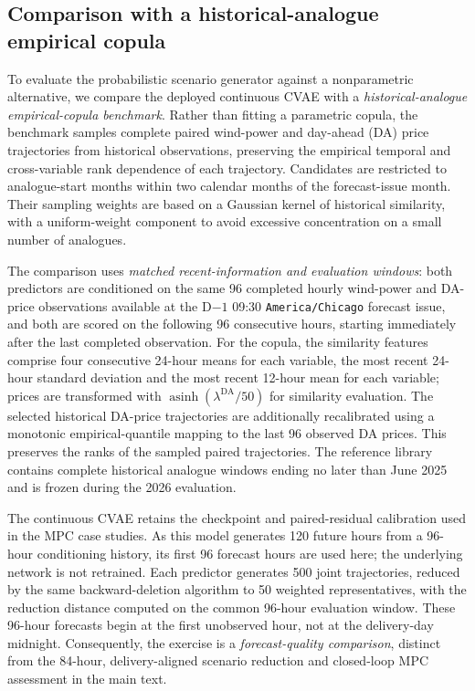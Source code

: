 \subsection{Comparison with a historical-analogue empirical copula}
\label{app:cvae_copula_96x96}

To evaluate the probabilistic scenario generator against a nonparametric
alternative, we compare the deployed continuous CVAE with a
\emph{historical-analogue empirical-copula benchmark}. Rather than fitting a
parametric copula, the benchmark samples complete paired wind-power and
day-ahead (DA) price trajectories from historical observations, preserving
the empirical temporal and cross-variable rank dependence of each trajectory.
Candidates are restricted to analogue-start months within two calendar months of
the forecast-issue month. Their sampling weights are based on a Gaussian kernel of
historical similarity, with a uniform-weight component to avoid excessive
concentration on a small number of analogues.

The comparison uses \emph{matched recent-information and evaluation windows}:
both predictors are conditioned on the same 96 completed hourly wind-power
and DA-price observations available at the D$-1$ 09:30
\texttt{America/Chicago} forecast issue, and both are scored on the
following 96 consecutive hours, starting immediately after the last completed
observation. For the copula, the similarity features comprise four consecutive
24-hour means for each variable, the most recent 24-hour standard deviation
and the most recent 12-hour mean for each variable; prices are transformed
with $\operatorname{asinh}(\lambda^{\mathrm{DA}}/50)$ for similarity evaluation.
The selected historical DA-price trajectories are additionally recalibrated
using a monotonic empirical-quantile mapping to the last 96 observed DA
prices. This preserves the ranks of the sampled paired trajectories.
The reference library contains complete historical analogue windows ending
no later than June 2025 and is frozen during the 2026 evaluation.

The continuous CVAE retains the checkpoint and paired-residual calibration
used in the MPC case studies. As this model generates 120 future hours from a
96-hour conditioning history, its first 96 forecast hours are used here;
the underlying network is not retrained. Each predictor generates 500 joint
trajectories, reduced by the same backward-deletion algorithm to 50 weighted
representatives, with the reduction distance computed on the common 96-hour
evaluation window. These 96-hour forecasts begin at the first unobserved hour,
not at the delivery-day midnight. Consequently, the exercise is a
\emph{forecast-quality comparison}, distinct from the 84-hour, delivery-aligned
scenario reduction and closed-loop MPC assessment in the main text.

